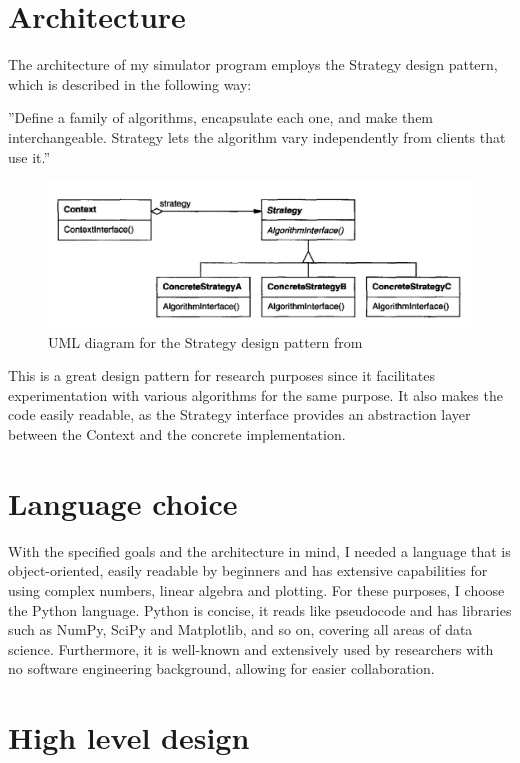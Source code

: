 \section{Architecture}

The architecture of my simulator program employs the Strategy design pattern, which is described in the following way:

''Define a family of algorithms, encapsulate each one, and make them interchangeable. Strategy lets the algorithm vary independently from clients that use it.''~\cite{DesignPatterns}

\begin{figure}[H]
  \includegraphics[width=\linewidth]{./figures/program/strategy.png}
  \caption{UML diagram for the Strategy design pattern from~\cite{DesignPatterns}}
\end{figure}

This is a great design pattern for research purposes since it facilitates experimentation with various algorithms for the same purpose. It also makes the code easily readable, as the Strategy interface provides an abstraction layer between the Context and the concrete implementation.

\section{Language choice}

With the specified goals and the architecture in mind, I needed a language that is object-oriented, easily readable by beginners and has extensive capabilities for using complex numbers, linear algebra and plotting. For these purposes, I choose the Python language. Python is concise, it reads like pseudocode and has libraries such as NumPy, SciPy and Matplotlib, and so on, covering all areas of data science. Furthermore, it is well-known and extensively used by researchers with no software engineering background, allowing for easier collaboration.

\section{High level design}

